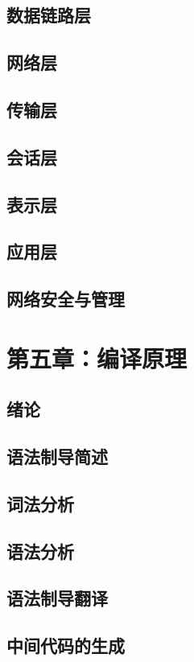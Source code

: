 \documentclass[UTF8]{article}
\begin{document}
        \subsection{数据链路层}
        \subsection{网络层}
        \subsection{传输层}
        \subsection{会话层}
        \subsection{表示层}
        \subsection{应用层}
        \subsection{网络安全与管理}
    \newpage
    \section{第五章：编译原理}
        \subsection{绪论}
        \subsection{语法制导简述}
        \subsection{词法分析}
        \subsection{语法分析}
        \subsection{语法制导翻译}
        \subsection{中间代码的生成}
\end{document}
